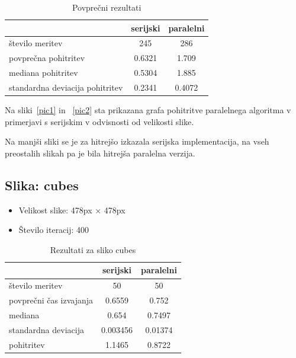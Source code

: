 \documentclass[11pt,a4paper]{article}
\begin{document}
\begin{table}[htbp]
\begin{center}
\begin{tabular}{|l|c|c|}
	\hline
		& serijski & paralelni  \\
	\hline
	število meritev & 245 & 286\\
	\hline
	povprečna pohitritev & 0.6321 & 1.709\\
    \hline
    mediana pohitritev & 0.5304 & 1.885\\
    \hline
     standardna deviacija pohitritev & 0.2341 & 0.4072\\
    \hline
\end{tabular}
\end{center}

\caption{Povprečni rezultati}
\label{table:ta}
\end{table}


Na sliki~\ref{pic1} in ~\ref{pic2} sta prikazana
grafa pohitritve paralelnega algoritma v primerjavi
s serijskim v odvisnosti od velikosti slike.


Na manjši sliki se je za hitrejšo izkazala serijska 
implementacija, na vseh preostalih slikah pa je bila
hitrejša paralelna verzija. 



\subsection{Slika: cubes}

\begin{itemize}
\item Velikost slike: 478px × 478px
\item Število iteracij: 400
\end{itemize}

\begin{table}[htbp]
\begin{center}
\begin{tabular}{|l|c|c|}
	\hline
		& serijski & paralelni  \\
	\hline
	število meritev & 50 & 50 \\
	\hline
	povprečni čas izvajanja & 0.6559  & 0.752\\
    \hline
    mediana &  0.654  & 0.7497\\
    \hline
    	standardna deviacija & 0.003456 & 0.01374  \\
    \hline
    pohitritev & 1.1465 & 0.8722 \\
    \hline
\end{tabular}
\end{center}

\caption{Rezultati za sliko cubes}
\label{table:ta}
\end{table}
\end{document}
